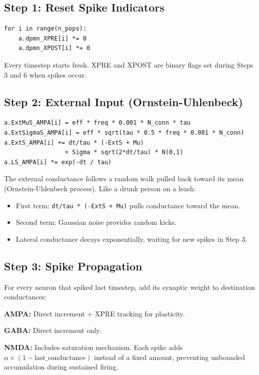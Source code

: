 \documentclass[11pt,a4paper]{article}
\begin{document}
\subsection{Step 1: Reset Spike Indicators}

\begin{lstlisting}
for i in range(n_pops):
    a.dpmn_XPRE[i] *= 0
    a.dpmn_XPOST[i] *= 0
\end{lstlisting}

Every timestep starts fresh. XPRE and XPOST are binary flags set during Steps 3 and 6 when spikes occur.

\subsection{Step 2: External Input (Ornstein-Uhlenbeck)}

\begin{lstlisting}
a.ExtMuS_AMPA[i] = eff * freq * 0.001 * N_conn * tau
a.ExtSigmaS_AMPA[i] = eff * sqrt(tau * 0.5 * freq * 0.001 * N_conn)
a.ExtS_AMPA[i] += dt/tau * (-ExtS + Mu) 
                 + Sigma * sqrt(2*dt/tau) * N(0,1)
a.LS_AMPA[i] *= exp(-dt / tau)
\end{lstlisting}

The external conductance follows a random walk pulled back toward its mean (Ornstein-Uhlenbeck process). Like a drunk person on a leash:
\begin{itemize}
    \item First term: \texttt{dt/tau * (-ExtS + Mu)} pulls conductance toward the mean.
    \item Second term: Gaussian noise provides random kicks.
    \item Lateral conductance decays exponentially, waiting for new spikes in Step 3.
\end{itemize}

\subsection{Step 3: Spike Propagation}

For every neuron that spiked last timestep, add its synaptic weight to destination conductances:

\textbf{AMPA:} Direct increment + XPRE tracking for plasticity.

\textbf{GABA:} Direct increment only.

\textbf{NMDA:} Includes saturation mechanism. Each spike adds $\alpha \times (1 - \text{last\_conductance})$ instead of a fixed amount, preventing unbounded accumulation during sustained firing.
\end{document}
